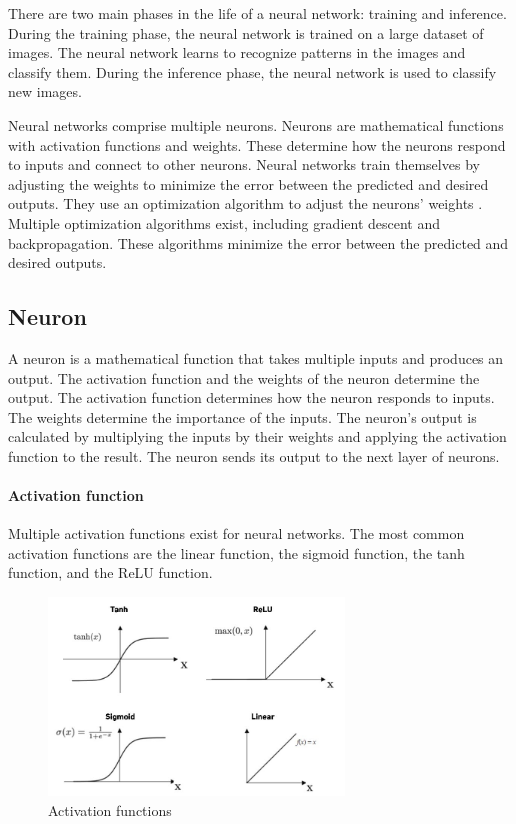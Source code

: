 There are two main phases in the life of a neural network: training and inference. During the training phase, the neural network is trained on a large dataset of images. The neural network learns to recognize patterns in the images and classify them. During the inference phase, the neural network is used to classify new images.

Neural networks comprise multiple neurons. Neurons are mathematical functions with activation functions and weights. These determine how the neurons respond to inputs and connect to other neurons. Neural networks train themselves by adjusting the weights to minimize the error between the predicted and desired outputs. They use an optimization algorithm to adjust the neurons' weights \cite{sun2019optimization}. Multiple optimization algorithms exist, including gradient descent\cite{zhang2019gradient} and backpropagation\cite{Sekhar}. These algorithms minimize the error between the predicted and desired outputs.

\subsection{Neuron}

A neuron is a mathematical function that takes multiple inputs and produces an output. The activation function and the weights of the neuron determine the output. The activation function determines how the neuron responds to inputs. The weights determine the importance of the inputs. The neuron's output is calculated by multiplying the inputs by their weights and applying the activation function to the result. The neuron sends its output to the next layer of neurons.

\paragraph{Activation function}

Multiple activation functions exist for neural networks. The most common activation functions are the linear function, the sigmoid function, the tanh function, and the ReLU function.

\begin{figure}[H]
    \centering
    \includegraphics[width=0.7\textwidth]{../Images/activation_functions.png}
    \caption{Activation functions}
    \label{fig:activation_functions}
\end{figure}

